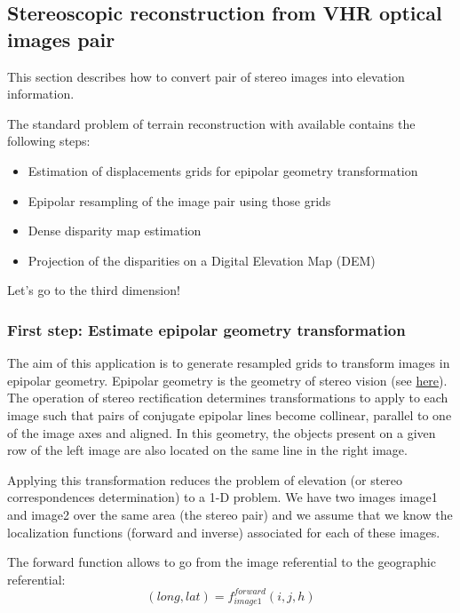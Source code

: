 \newpage
\subsection{Stereoscopic reconstruction from VHR optical images pair}\label{sec:stereoreconstruction}
This section describes how to convert pair of stereo images into elevation information.

The standard problem of terrain reconstruction with available \app contains
the following steps:

\begin{itemize}
\item Estimation of displacements grids for epipolar geometry transformation
\item Epipolar resampling of the image pair using those grids
\item Dense disparity map estimation
\item Projection of the disparities on a Digital Elevation Map (DEM)
\end{itemize}

Let's go to the third dimension!

\subsubsection{First step: Estimate epipolar geometry transformation}\label{ssec:epipolar}

The aim of this application is to generate resampled grids to
transform images in epipolar geometry. Epipolar geometry is the
geometry of stereo vision
(see \href{http://en.wikipedia.org/wiki/Epipolar_geometry}{here}). The
operation of stereo rectification determines transformations to apply
to each image such that pairs of conjugate epipolar lines become
collinear, parallel to one of the image axes and aligned. In this
geometry, the objects present on a given row of the left image are
also located on the same line in the right image.

Applying this transformation reduces the problem of elevation (or
stereo correspondences determination) to a 1-D problem. We have two
images image1 and image2 over the same area (the stereo pair) and we
assume that we know the localization functions (forward and inverse)
associated for each of these images.

The forward function allows to go from the image referential to the geographic
referential:
\begin{equation}
  (long,lat) = f^{forward}_{image1}(i,j,h)
\end{equation}

